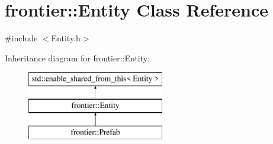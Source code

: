 \hypertarget{classfrontier_1_1_entity}{}\section{frontier\+:\+:Entity Class Reference}
\label{classfrontier_1_1_entity}


{\ttfamily \#include $<$Entity.\+h$>$}

Inheritance diagram for frontier\+:\+:Entity\+:\begin{figure}[H]
\begin{center}
\leavevmode
\includegraphics[height=3.000000cm]{classfrontier_1_1_entity}
\end{center}
\end{figure}
